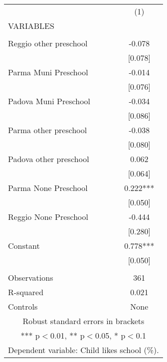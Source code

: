 \begin{tabular}{lc} \hline
 & (1) \\
VARIABLES &  \\ \hline
 &  \\
Reggio other preschool & -0.078 \\
 & [0.078] \\
Parma Muni Preschool & -0.014 \\
 & [0.076] \\
Padova Muni Preschool & -0.034 \\
 & [0.086] \\
Parma other preschool & -0.038 \\
 & [0.080] \\
Padova other preschool & 0.062 \\
 & [0.064] \\
Parma None Preschool & 0.222*** \\
 & [0.050] \\
Reggio None Preschool & -0.444 \\
 & [0.280] \\
Constant & 0.778*** \\
 & [0.050] \\
 &  \\
Observations & 361 \\
R-squared & 0.021 \\
 Controls & None \\ \hline
\multicolumn{2}{c}{ Robust standard errors in brackets} \\
\multicolumn{2}{c}{ *** p$<$0.01, ** p$<$0.05, * p$<$0.1} \\
\multicolumn{2}{c}{ Dependent variable: Child likes school (\%).} \\
\end{tabular}
